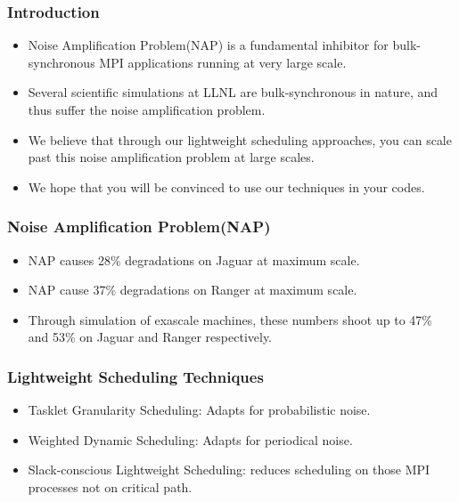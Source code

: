 \begin{frame}
\frametitle{Introduction}
\begin{itemize}
\item \small Noise Amplification Problem(NAP) is a fundamental inhibitor for bulk-synchronous MPI applications running at very large scale.
\item \small Several scientific simulations at LLNL are bulk-synchronous in nature, and thus suffer the noise amplification problem.
\item \small We believe that through our lightweight scheduling approaches, you can scale past this noise amplification problem at large scales.
\item \small We hope that you will be convinced to use our techniques in your codes.
\end{itemize}
\end{frame}


\begin{frame}
\frametitle{Noise Amplification Problem(NAP)}

\begin{itemize}
\item NAP causes 28\% degradations on Jaguar at maximum scale.
\item NAP cause 37\% degradations on Ranger at maximum scale.
\item Through simulation of exascale machines, these numbers shoot up to 47\% and 53\% on Jaguar and Ranger respectively.
\end{itemize}
\end{frame}

\begin{frame}
\frametitle{Lightweight Scheduling Techniques}
\begin{itemize}
\item Tasklet Granularity Scheduling: Adapts for probabilistic noise.
\item Weighted Dynamic Scheduling: Adapts for periodical noise.
\item Slack-conscious Lightweight Scheduling: reduces scheduling on those MPI processes not on critical path.
\end{itemize}
\end{frame}

